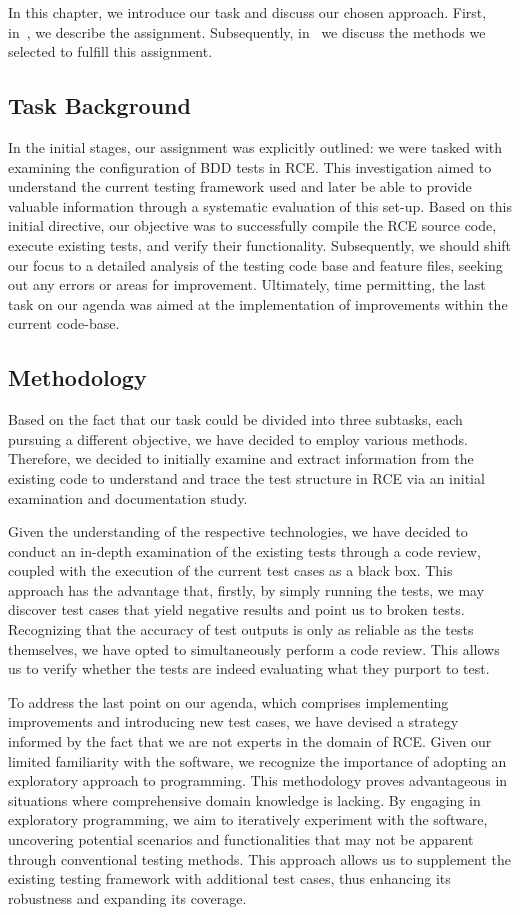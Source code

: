 In this chapter, we introduce our task and discuss our chosen approach. First, in~, we describe the assignment. Subsequently, in~ we discuss the methods we selected to fulfill this assignment.

\subsection{Task Background}
\label{subsec:Task}
In the initial stages, our assignment was explicitly outlined: we were tasked with examining the configuration of \ac{BDD} tests in \ac{RCE}. This investigation aimed to understand the current testing framework used and later be able to provide valuable information through a systematic evaluation of this set-up. Based on this initial directive, our objective was to successfully compile the \ac{RCE} source code, execute existing tests, and verify their functionality. Subsequently, we should shift our focus to a detailed analysis of the testing code base and feature files, seeking out any errors or areas for improvement. Ultimately, time permitting, the last task on our agenda was aimed at the implementation of improvements within the current code-base.

\subsection{Methodology}
\label{subsec:Methodologies}
Based on the fact that our task could be divided into three subtasks, each pursuing a different objective, we have decided to employ various methods. Therefore, we decided to initially examine and extract information from the existing code to understand and trace the test structure in \ac{RCE} via an initial examination and documentation study.

Given the understanding of the respective technologies, we have decided to conduct an in-depth examination of the existing tests through a code review, coupled with the execution of the current test cases as a black box. This approach has the advantage that, firstly, by simply running the tests, we may discover test cases that yield negative results and point us to broken tests. Recognizing that the accuracy of test outputs is only as reliable as the tests themselves, we have opted to simultaneously perform a code review. This allows us to verify whether the tests are indeed evaluating what they purport to test. 

To address the last point on our agenda, which comprises implementing improvements and introducing new test cases, we have devised a strategy informed by the fact that we are not experts in the domain of \ac{RCE}. Given our limited familiarity with the software, we recognize the importance of adopting an exploratory approach to programming. This methodology proves advantageous in situations where comprehensive domain knowledge is lacking. By engaging in exploratory programming, we aim to iteratively experiment with the software, uncovering potential scenarios and functionalities that may not be apparent through conventional testing methods. This approach allows us to supplement the existing testing framework with additional test cases, thus enhancing its robustness and expanding its coverage.